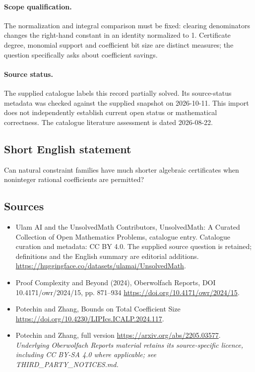 \documentclass[11pt]{article}
\begin{document}
\paragraph{Scope qualification.}
The normalization and integral comparison must be fixed: clearing denominators changes the right-hand constant in an identity normalized to 1. Certificate degree, monomial support and coefficient bit size are distinct measures; the question specifically asks about coefficient savings.
\paragraph{Source status.}
The supplied catalogue labels this record partially solved. Its source-status metadata was checked against the supplied snapshot on 2026-10-11. This import does not independently establish current open status or mathematical correctness. The catalogue literature assessment is dated 2026-08-22.
\subsection{Short English statement}
Can natural constraint families have much shorter algebraic certificates when noninteger rational coefficients are permitted?
\subsection{Sources}
\begin{itemize}
\item[S1] Ulam AI and the UnsolvedMath Contributors, UnsolvedMath: A Curated Collection of Open Mathematics Problems, catalogue entry. Catalogue curation and metadata: CC BY 4.0. The supplied source question is retained; definitions and the English summary are editorial additions.
\url{https://huggingface.co/datasets/ulamai/UnsolvedMath}.
\item[S2] Proof Complexity and Beyond (2024), Oberwolfach Reports, DOI 10.4171/owr/2024/15, pp. 871--934
\url{https://doi.org/10.4171/owr/2024/15}.
\item[S3] Potechin and Zhang, Bounds on Total Coefficient Size
\url{https://doi.org/10.4230/LIPIcs.ICALP.2024.117}.
\item[S4] Potechin and Zhang, full version
\url{https://arxiv.org/abs/2205.03577}.
\textit{Underlying Oberwolfach Reports material retains its source-specific licence, including CC BY-SA 4.0 where applicable; see THIRD\_PARTY\_NOTICES.md.}
\end{itemize}
\end{document}
